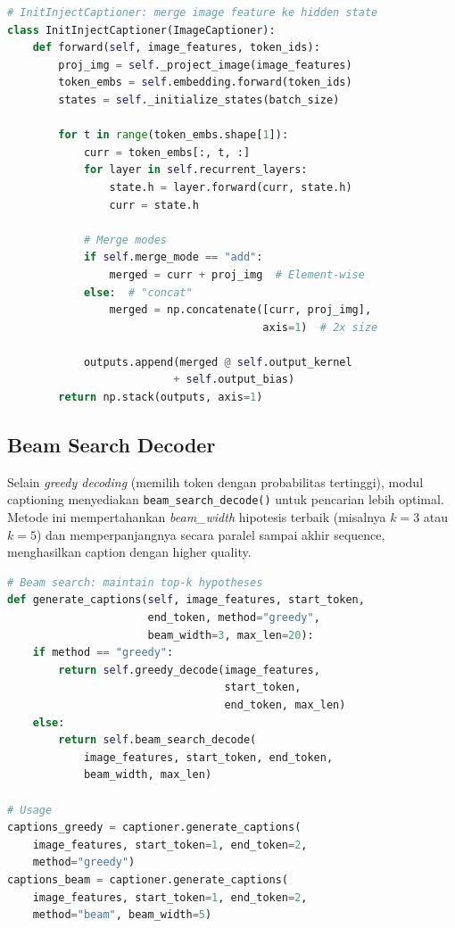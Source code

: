 \begin{lstlisting}[language=Python, basicstyle=\ttfamily\small]
# InitInjectCaptioner: merge image feature ke hidden state
class InitInjectCaptioner(ImageCaptioner):
    def forward(self, image_features, token_ids):
        proj_img = self._project_image(image_features)
        token_embs = self.embedding.forward(token_ids)
        states = self._initialize_states(batch_size)
        
        for t in range(token_embs.shape[1]):
            curr = token_embs[:, t, :]
            for layer in self.recurrent_layers:
                state.h = layer.forward(curr, state.h)
                curr = state.h
            
            # Merge modes
            if self.merge_mode == "add":
                merged = curr + proj_img  # Element-wise
            else:  # "concat"
                merged = np.concatenate([curr, proj_img], 
                                        axis=1)  # 2x size
            
            outputs.append(merged @ self.output_kernel 
                          + self.output_bias)
        return np.stack(outputs, axis=1)
\end{lstlisting}

\subsection{Beam Search Decoder}
Selain \textit{greedy decoding} (memilih token dengan probabilitas tertinggi), modul captioning menyediakan \texttt{beam\_search\_decode()} untuk pencarian lebih optimal. Metode ini mempertahankan \textit{beam\_width} hipotesis terbaik (misalnya $k=3$ atau $k=5$) dan memperpanjangnya secara paralel sampai akhir sequence, menghasilkan caption dengan higher quality.

\begin{lstlisting}[language=Python, basicstyle=\ttfamily\small]
# Beam search: maintain top-k hypotheses
def generate_captions(self, image_features, start_token, 
                      end_token, method="greedy", 
                      beam_width=3, max_len=20):
    if method == "greedy":
        return self.greedy_decode(image_features, 
                                  start_token, 
                                  end_token, max_len)
    else:
        return self.beam_search_decode(
            image_features, start_token, end_token, 
            beam_width, max_len)

# Usage
captions_greedy = captioner.generate_captions(
    image_features, start_token=1, end_token=2, 
    method="greedy")
captions_beam = captioner.generate_captions(
    image_features, start_token=1, end_token=2, 
    method="beam", beam_width=5)
\end{lstlisting}

